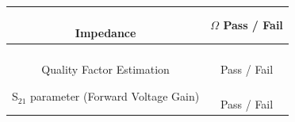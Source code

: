 \documentclass[12pt]{article}
\begin{document}
\begin{table}[h!]
\begin{tabular}{ | c | c | }
\hline
\parbox{0.5\linewidth}{\raggedright \hfill \\[-0.25 em]
Impedance
\hfill \\[0.1 em]} &  \parbox{0.4\linewidth}{\raggedright \hfill \\ [0.7 em]\underline{\hspace{0.625in}} 
$\Omega$
\hspace{0.125 in}Pass \space / \space  Fail \hfill \\ [0.3 em]} \\ 
\hline
\parbox{0.5\linewidth}{\raggedright \hfill \\[-0.25 em]
Quality Factor Estimation
\hfill \\[0.1 em]} &  \parbox{0.4\linewidth}{\raggedright \hfill \\ [0.7 em]\underline{\hspace{0.625in}} 
\hspace{0.125 in}Pass \space / \space  Fail \hfill \\ [0.3 em]} \\ 
\hline
\parbox{0.5\linewidth}{\raggedright \hfill \\[-0.25 em]
S$_{21}$ parameter (Forward Voltage Gain)
\hfill \\[0.1 em]} &  \parbox{0.4\linewidth}{\raggedright \hfill \\ [0.7 em]\underline{\hspace{0.625in}} 
\hspace{0.125 in}Pass \space / \space  Fail \hfill \\ [0.3 em]} \\ 
\hline
\end{tabular}
\end{table}
\end{document}
